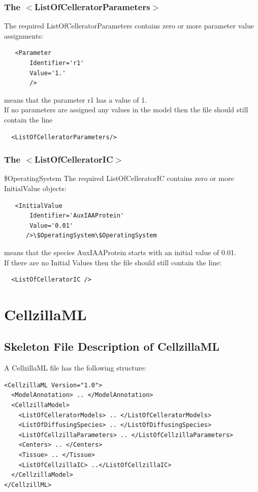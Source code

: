 \documentclass[12pt,letterpaper]{article}
\begin{document}
\subsubsection{The $<$ListOfCelleratorParameters$>$}
The required ListOfCelleratorParameters contains zero or more parameter value assignments: 

\begin{verbatim}
   <Parameter 
       Identifier='r1'
       Value='1.' 
       />
\end{verbatim}
means that the parameter r1 has a value of 1. \\

If no parameters are assigned any values in the model then the file should still contain the line
\begin{verbatim}
  <ListOfCelleratorParameters/>
\end{verbatim}


\subsubsection{The $<$ListOfCelleratorIC$>$}\$OperatingSystem
The required ListOfCelleratorIC contains zero or more InitialValue objects:

\begin{verbatim}
   <InitialValue 
       Identifier='AuxIAAProtein'
       Value='0.01' 
      />\$OperatingSystem\$OperatingSystem
\end{verbatim}
means that the species AuxIAAProtein starts with an initial value of 0.01.\\

If there are no Initial Values then the file should still contain the line:

\begin{verbatim}
  <ListOfCelleratorIC />
\end{verbatim}

\section{CellzillaML}\label{section:CellzillaML}

\subsection{Skeleton File Description of CellzillaML}

A CellzillaML file has the following structure: 

\begin{verbatim}
<CellzillaML Version="1.0">
  <ModelAnnotation> .. </ModelAnnotation>
  <CellzillaModel>
    <ListOfCelleratorModels> .. </ListOfCelleratorModels>
    <ListOfDiffusingSpecies> .. </ListOfDiffusingSpecies>
    <ListOfCellzillaParameters> .. </ListOfCellzillaParameters>
    <Centers> .. </Centers>
    <Tissue> .. </Tissue>
    <ListOfCellzillaIC> ..</ListOfCellzillaIC>
  </CellzillaModel>
</CellzillML>
\end{verbatim}
\end{document}
